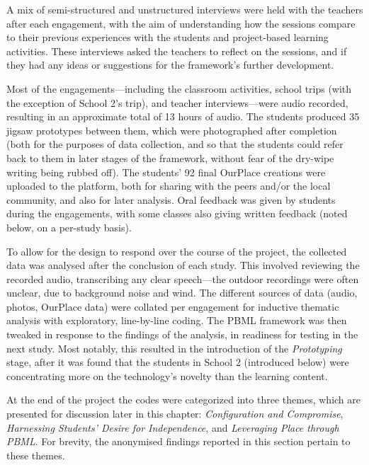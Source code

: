 A mix of semi-structured and unstructured interviews were held with the teachers after each engagement, with the aim of understanding how the sessions compare to their previous experiences with the students and project-based learning activities. These interviews asked the teachers to reflect on the sessions, and if they had any ideas or suggestions for the framework's further development.

Most of the engagements---including the classroom activities, school trips (with the exception of School 2's trip), and teacher interviews---were audio recorded, resulting in an approximate total of 13 hours of audio. The students produced 35 jigsaw prototypes between them, which were photographed after completion (both for the purposes of data collection, and so that the students could refer back to them in later stages of the framework, without fear of the dry-wipe writing being rubbed off). The students' 92 final OurPlace creations were uploaded to the platform, both for sharing with the peers and/or the local community, and also for later analysis. Oral feedback was given by students during the engagements, with some classes also giving written feedback (noted below, on a per-study basis).

To allow for the design to respond over the course of the project, the collected data was analysed after the conclusion of each study. This involved reviewing the recorded audio, transcribing any clear speech---the outdoor recordings were often unclear, due to background noise and wind. The different sources of data (audio, photos, OurPlace data) were collated per engagement for inductive thematic analysis with exploratory, line-by-line coding. The PBML framework was then tweaked in response to the findings of the analysis, in readiness for testing in the next study. Most notably, this resulted in the introduction of the \textit{Prototyping} stage, after it was found that the students in School 2 (introduced below) were concentrating more on the technology's novelty than the learning content.

At the end of the project the codes were categorized into three themes, which are presented for discussion later in this chapter: \textit{Configuration and Compromise}, \textit{Harnessing Students' Desire for Independence}, and \textit{Leveraging Place through PBML}. For brevity, the anonymised findings reported in this section pertain to these themes.


